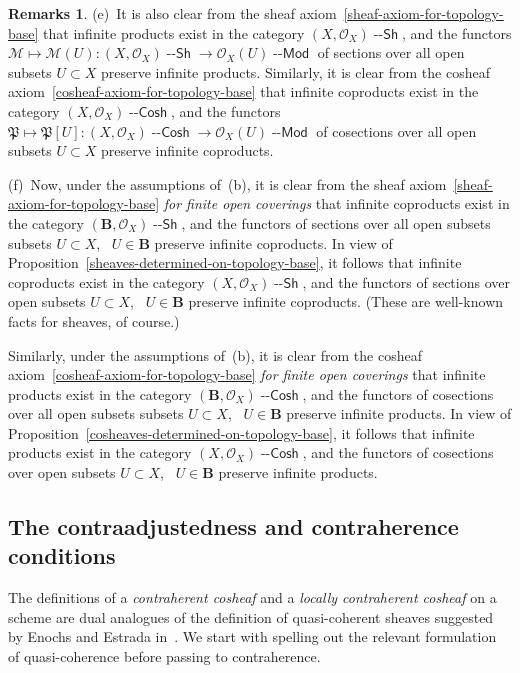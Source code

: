\documentclass[12pt,a4paper]{amsart}
\newcommand{\+}{\nobreakdash-}
\renewcommand{\:}{\colon}
\newcommand{\rarrow}{\longrightarrow}
\newcommand{\Modl}{{\operatorname{\mathsf{--Mod}}}}
\newcommand{\Sh}{{\operatorname{\mathsf{--Sh}}}}
\newcommand{\Cosh}{{\operatorname{\mathsf{--Cosh}}}}
\newcommand{\bB}{\mathbf B}
\newcommand{\cO}{\mathcal O}
\newcommand{\cM}{\mathcal M}
\newcommand{\fP}{\mathfrak P}
\theoremstyle{plain}
\theoremstyle{definition}
\newtheorem{rems}[thm]{Remarks}
\begin{document}
\begin{rems}
\smallskip
 (e)~It is also clear from the sheaf
axiom~\eqref{sheaf-axiom-for-topology-base} that infinite products
exist in the category $(X,\cO_X)\Sh$, and the functors $\cM\longmapsto
\cM(U)\:(X,\cO_X)\Sh\rarrow\cO_X(U)\Modl$ of sections over all open
subsets $U\subset X$ preserve infinite products.
 Similarly, it is clear from the cosheaf 
axiom~\eqref{cosheaf-axiom-for-topology-base} that infinite coproducts
exist in the category $(X,\cO_X)\Cosh$, and the functors $\fP\longmapsto
\fP[U]\:(X,\cO_X)\Cosh\rarrow\cO_X(U)\Modl$ of cosections over all open
subsets $U\subset X$ preserve infinite coproducts.

\smallskip
 (f)~Now, under the assumptions of~(b), it is clear from the sheaf
axiom~\eqref{sheaf-axiom-for-topology-base} \emph{for finite open
coverings} that infinite coproducts exist in the category
$(\bB,\cO_X)\Sh$, and the functors of sections over all open
subsets subsets $U\subset X$, \ $U\in\bB$ preserve infinite coproducts.
 In view of
Proposition~\ref{sheaves-determined-on-topology-base}, it follows
that infinite coproducts exist in the category $(X,\cO_X)\Sh$,
and the functors of sections over open subsets $U\subset X$, \ $U\in\bB$
preserve infinite coproducts.
 (These are well-known facts for sheaves, of course.)

 Similarly, under the assumptions of~(b), it is clear from the cosheaf
axiom~\eqref{cosheaf-axiom-for-topology-base} \emph{for finite open
coverings} that infinite products exist in the category
$(\bB,\cO_X)\Cosh$, and the functors of cosections over all open
subsets subsets $U\subset X$, \ $U\in\bB$ preserve infinite products.
 In view of
Proposition~\ref{cosheaves-determined-on-topology-base}, it follows
that infinite products exist in the category $(X,\cO_X)\Cosh$,
and the functors of cosections over open subsets $U\subset X$, \
$U\in\bB$ preserve infinite products.
\end{rems}

\subsection{The contraadjustedness and contraherence conditions}
\label{contraadj-contraher-subsecn}
 The definitions of a \emph{contraherent cosheaf} and a \emph{locally
contraherent cosheaf} on a scheme are dual analogues of the definition
of quasi-coherent sheaves suggested by Enochs and Estrada
in~\cite{EE}.
 We start with spelling out the relevant formulation of quasi-coherence
before passing to contraherence.
\end{document}

